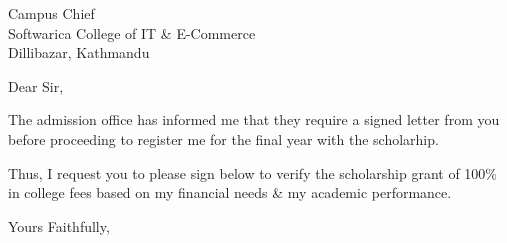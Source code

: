 \documentclass{letter}
\begin{document}
\begin{letter}{	Campus Chief \\ Softwarica College of IT \& E-Commerce \\ Dillibazar, Kathmandu}

\opening{Dear Sir,}

The admission office has informed me that they require a signed letter from you before proceeding to register me for the final year with the scholarhip.

Thus, I request you to please sign below to verify the scholarship grant of 100\% in college fees based on my financial needs \& my academic performance.

\closing{Yours Faithfully,}

\end{letter}
\end{document}
